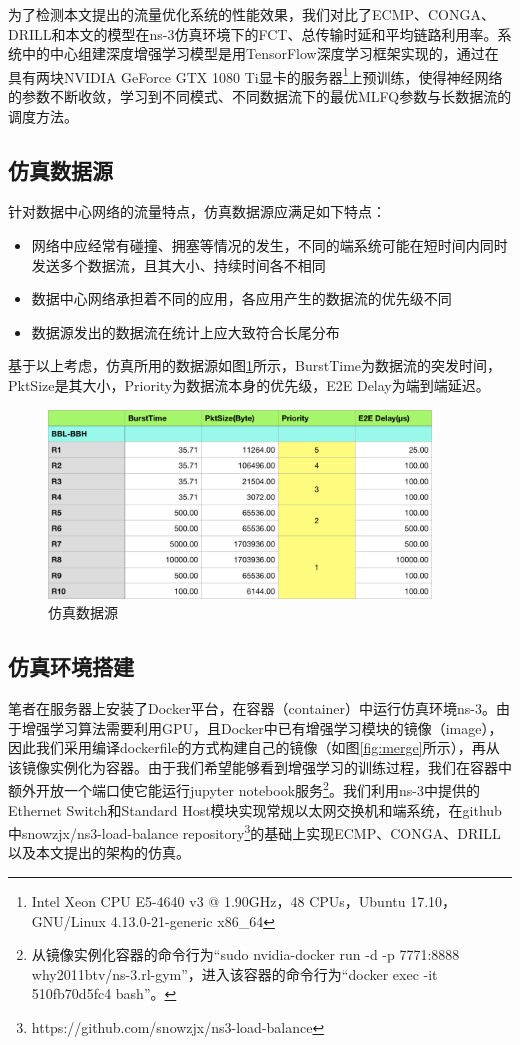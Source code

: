 为了检测本文提出的流量优化系统的性能效果，我们对比了ECMP、CONGA、DRILL和本文的模型在ns-3仿真环境下的FCT、总传输时延和平均链路利用率。系统中的中心组建深度增强学习模型是用TensorFlow深度学习框架\cite{tensorflow}实现的，通过在具有两块NVIDIA GeForce GTX 1080 Ti显卡的服务器\footnote{Intel Xeon CPU E5-4640 v3 @ 1.90GHz，48 CPUs，Ubuntu 17.10，GNU/Linux 4.13.0-21-generic x86\_64}上预训练，使得神经网络的参数不断收敛，学习到不同模式、不同数据流下的最优MLFQ参数与长数据流的调度方法。

\subsection{仿真数据源}
针对数据中心网络的流量特点，仿真数据源应满足如下特点：
\begin{itemize}
    \item 网络中应经常有碰撞、拥塞等情况的发生，不同的端系统可能在短时间内同时发送多个数据流，且其大小、持续时间各不相同
    \item 数据中心网络承担着不同的应用，各应用产生的数据流的优先级不同
    \item 数据源发出的数据流在统计上应大致符合长尾分布
\end{itemize}
基于以上考虑，仿真所用的数据源如图\ref{fig:datasource}所示，BurstTime为数据流的突发时间，PktSize是其大小，Priority为数据流本身的优先级，E2E Delay为端到端延迟。
\begin{figure}[ht]
\centering
\includegraphics[height=5cm]{figure/datasor.png}
\caption{仿真数据源}
\label{fig:datasource}
\end{figure}

\subsection{仿真环境搭建}
笔者在服务器上安装了Docker平台\cite{docker}，在容器（container）中运行仿真环境ns-3。由于增强学习算法需要利用GPU，且Docker中已有增强学习模块的镜像（image），因此我们采用编译dockerfile的方式构建自己的镜像（如图\ref{fig:merge}所示），再从该镜像实例化为容器。由于我们希望能够看到增强学习的训练过程，我们在容器中额外开放一个端口使它能运行jupyter notebook服务\footnote{从镜像实例化容器的命令行为“sudo nvidia-docker run -d -p 7771:8888 why2011btv/ns-3.rl-gym”，进入该容器的命令行为“docker exec -it 510fb70d5fc4 bash”。}。我们利用ns-3中提供的Ethernet Switch和Standard Host模块实现常规以太网交换机和端系统，在github中snowzjx/ns3-load-balance repository\footnote{https://github.com/snowzjx/ns3-load-balance}的基础上实现ECMP、CONGA、DRILL以及本文提出的架构的仿真。

